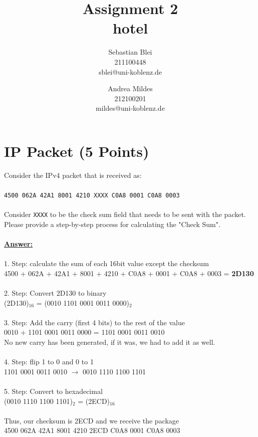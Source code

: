 \documentclass{scrartcl}
\author{%
  Sebastian Blei \\ \normalsize{211100448} \\{\normalsize sblei@uni-koblenz.de} \and
  Andrea Mildes \\ \normalsize{212100201} \\{\normalsize mildes@uni-koblenz.de}
}
\title{Assignment 2 \\ hotel}
\date{}
\begin{document}
\maketitle



\section{IP Packet (5 Points)}

Consider the IPv4 packet that is received as:\\ \\
\texttt{4500 062A 42A1 8001 4210 XXXX C0A8 0001 C0A8 0003}\\ \\ 
Consider \texttt{XXXX} to be the check sum field that needs to be sent with the packet.\\
Please provide a step-by-step process for calculating the "Check Sum".\\ \\ 
\textbf{\underline{Answer:}}\\
\\
1. Step: calculate the sum of each 16bit value except the checksum\\
4500 + 062A + 42A1 + 8001 + 4210 + C0A8 + 0001 + C0A8 + 0003 = \textbf{2D130}\\
\\
2. Step: Convert 2D130 to binary\\
(2D130)$_{16}$ = (0010 1101 0001 0011 0000)$_{2}$\\
\\
3. Step: Add the carry (first 4 bits) to the rest of the value\\
0010 + 1101 0001 0011 0000 = 1101 0001 0011 0010\\
No new carry has been generated, if it was, we had to add it as well.\\
\\
4. Step: flip 1 to 0 and 0 to 1\\
1101 0001 0011 0010 $\rightarrow$ 0010 1110 1100 1101\\
\\
5. Step: Convert to hexadecimal\\
(0010 1110 1100 1101)$_{2}$ = (2ECD)$_{16}$\\
\\
Thus, our checksum is 2ECD and we receive the package\\
4500 062A 42A1 8001 4210 2ECD C0A8 0001 C0A8 0003
\end{document}
